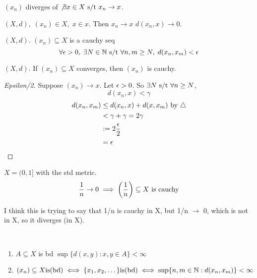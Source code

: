 \documentclass[12pt]{article}
\begin{document}
\bboxdefn
\begin{defn}[Divergence]\label{defn:divergence}
  \((x_n)\) diverges of \(\not\exists x\in X\text{ s/t } x_n\to x\).
\end{defn}
\ebox

\bboxnote
\begin{note}
  \((X,d),\;(x_n)\in X,\;x\in x\). Then \(x_n\to x\) 
  \(d(x_n,x)\to 0\).
\end{note}
\ebox

\bboxdefn
\begin{defn}[Cauchy]
  \((X,d)\). \((x_n)\subseteq X\) is a cauchy seq 
  \[\forall\epsilon>0,\;\exists N\in\mathbb N\text{ s/t }\forall n,m\ge N,\;
  d(x_n,x_m)<\epsilon\]
\end{defn}
\ebox


\bboxprop
\begin{prop}
  \((X,d)\). If \((x_n)\subseteq X\) converges, then \((x_n)\) is cauchy.
\end{prop}
\ebox

\bboxproof
\begin{proof}[Epsilon/2]
  Suppose \((x_n)\to x\). Let \(\epsilon>0\). So \(\exists N\text{ s/t }\forall n\ge N\), 
  \[d(x_n,x)<\gamma\]
  \begin{align*}
    d(x_n,x_m)&\le d(x_n,x)+d(x,x_m)\text{ by }\triangle\\
              &<\gamma+\gamma=2\gamma\\
              &:=2\frac{\epsilon}2\\
              &=\epsilon
  \end{align*}
\end{proof}
\ebox

\bboxexam
\begin{exam}
  \(X=(0,1]\) with the std metric.
  \[\frac1n\to0\implies\left(\frac1n\right)\subseteq X\text{ is cauchy}\]
  \bboxnote
  \begin{note}
    I think this is trying to say that 1/n is cauchy in X, but 
    1/n \(\to\) 0, which is not in X, so it diverges (in X).
  \end{note}
  \ebox

\end{exam}
\ebox



\bboxdefn
\begin{defn}[Bounded]\ \label{defn:bounded}
    \begin{enumerate}
        \item \(A\subseteq X\) is bd 
            \(\sup\{d(x,y):x,y\in A\}<\infty\)
        \item \((x_n)\subseteq X\mathrm{is}(\mathrm{bd})\iff\{x_1,x_2,\dots\}\mathrm{is}(\mathrm{bd})
            \iff\sup\{n,m\in\mathbb N:d(x_n,x_m)\}<\infty\)
    \end{enumerate}
\end{defn}
\ebox
\end{document}
